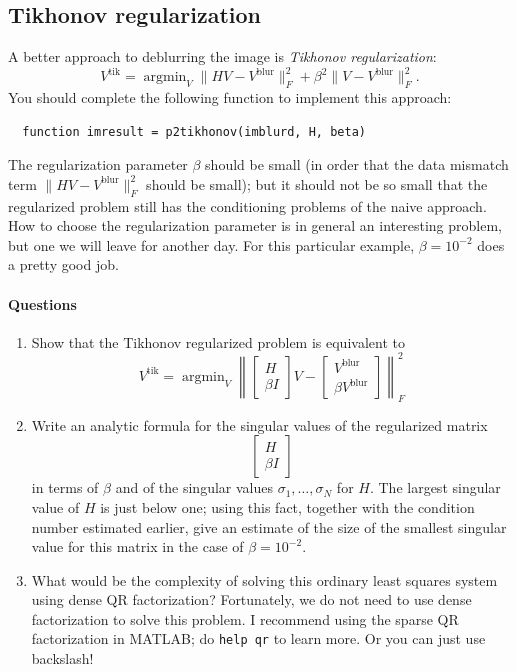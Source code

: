\documentclass[12pt, leqno]{article} %
\begin{document}
\subsection{Tikhonov regularization}

A better approach to deblurring the image is {\em Tikhonov
  regularization}:
\[
  V^{\mathrm{tik}} = 
  \operatorname{argmin}_V \|HV-V^{\mathrm{blur}}\|_F^2 + \beta^2 \|V-V^{\mathrm{blur}}\|_F^2.
\]
You should complete the following function to implement this approach:
\begin{lstlisting}
  function imresult = p2tikhonov(imblurd, H, beta)
\end{lstlisting}
The regularization parameter $\beta$ should be small (in order that
the data mismatch term $\|HV-V^{\mathrm{blur}}\|_F^2$ should be
small); but it should not be so small that the regularized problem
still has the conditioning problems of the naive approach.  How to
choose the regularization parameter is in general an interesting
problem, but one we will leave for another day.  For this particular
example, $\beta = 10^{-2}$ does a pretty good job.

\paragraph*{Questions}
\begin{enumerate}
\item
  Show that the Tikhonov regularized problem is equivalent to
  \[
  V^{\mathrm{tik}} = \operatorname{argmin}_V
  \left\| 
    \begin{bmatrix} H \\ \beta I \end{bmatrix} V -
    \begin{bmatrix} V^{\mathrm{blur}} \\ \beta V^{\mathrm{blur}} \end{bmatrix}
  \right\|_F^2
  \]
\item
  Write an analytic formula for the singular values of the regularized
  matrix
  \[
    \begin{bmatrix} H \\ \beta I \end{bmatrix}
  \]
  in terms of $\beta$ and of the singular values $\sigma_1, \ldots,
  \sigma_N$ for $H$.  The largest singular value of $H$ is just below
  one; using this fact, together with the condition number estimated
  earlier, give an estimate of the size of the smallest singular value
  for this matrix in the case of $\beta = 10^{-2}$.
\item
  What would be the complexity of solving this ordinary least
  squares system using dense QR factorization?
  Fortunately, we do not need to use dense factorization to solve this
  problem.  I recommend using the sparse QR factorization in MATLAB;
  do {\tt help qr} to learn more.  Or you can just use backslash!
\end{enumerate}
\end{document}
